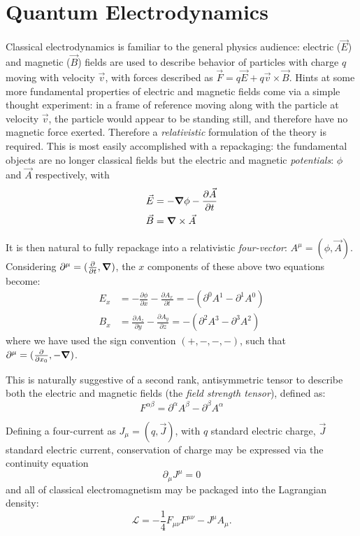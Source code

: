 \FloatBarrier
\section{Quantum Electrodynamics}
Classical electrodynamics is familiar to the general physics audience: electric ($\vec{E}$) and magnetic ($\vec{B}$) 
fields are used to describe behavior of particles with charge $q$ moving with velocity $\vec{v}$, with 
forces described as $\vec{F} =q\vec{E} + q \vec{v} \times \vec{B}$. Hints at some more fundamental properties of
electric and magnetic fields come via a simple thought experiment: in a frame of reference moving along with 
the particle at velocity $\vec{v}$, the particle would appear to be standing still, and therefore have no 
magnetic force exerted. Therefore a \emph{relativistic} formulation of the theory is required. This is most 
easily accomplished with a repackaging: the fundamental objects are no longer classical fields but the electric 
and magnetic \emph{potentials}: $\phi$ and $\vec{A}$ respectively, with
\begin{align}
\vec{E} &= -\grad\phi - \frac{\partial \vec{A}}{\partial t}\\
\vec{B} &= \grad \times \vec{A}
\end{align}

It is then natural to fully repackage into a relativistic \emph{four-vector}: $A^{\mu} = (\phi, \vec{A})$. 
Considering $\partial^{\mu} = (\frac{\partial}{\partial t}, \grad)$, the $x$ components of these above 
two equations become:
\begin{align}
E_{x} &= -\frac{\partial \phi}{\partial x} - \frac{\partial A_{x}}{\partial t} = -( \partial^0 A^1 - \partial^1 A^0)\\
B_{x} &= \frac{\partial A_{z}}{\partial y} - \frac{\partial A_{y}}{\partial z} = -(\partial^2 A^3 - \partial^3 A^2)
\end{align}
where we have used the sign convention $(+, -, -, -)$, such that 
$\partial^{\mu} = (\frac{\partial}{\partial x_0}, -\grad)$.

This is naturally suggestive of a second rank, antisymmetric tensor to describe both the electric and magnetic 
fields (the \emph{field strength tensor}), defined as:
\begin{equation}
F^{\alpha\beta} = \partial^{\alpha}A^{\beta} - \partial^{\beta} A^{\alpha}
\end{equation}

Defining a four-current as $J_{\mu} = (q, \vec{J})$, with $q$ standard electric charge, $\vec{J}$ standard electric 
current, conservation of charge may be expressed via the continuity equation
\begin{equation}
\partial_{\mu}J^\mu = 0
\end{equation}
and all of classical electromagnetism may be packaged into the Lagrangian density:
\begin{equation}
\mathcal{L} = -\frac{1}{4} F_{\mu\nu}F^{\mu\nu} - J^{\mu}A_{\mu}.
\end{equation}

